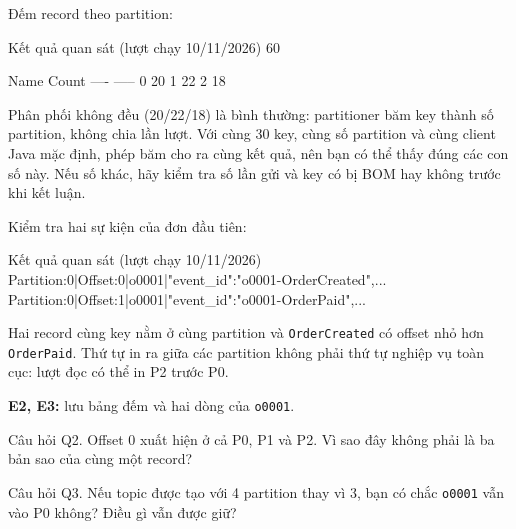 Đếm record theo partition:



\begin{aivnCodeOutput}{Kết quả quan sát (lượt chạy 10/11/2026)}
60

Name Count
---- -----
0       20
1       22
2       18
\end{aivnCodeOutput}

Phân phối không đều (20/22/18) là bình thường: partitioner băm key thành số partition, không chia lần lượt. Với cùng 30 key, cùng số partition và cùng client Java mặc định, phép băm cho ra cùng kết quả, nên bạn có thể thấy đúng các con số này. Nếu số khác, hãy kiểm tra số lần gửi và key có bị BOM hay không trước khi kết luận.


Kiểm tra hai sự kiện của đơn đầu tiên:



\begin{aivnCodeOutput}{Kết quả quan sát (lượt chạy 10/11/2026)}
Partition:0|Offset:0|o0001|{"event_id":"o0001-OrderCreated",...}
Partition:0|Offset:1|o0001|{"event_id":"o0001-OrderPaid",...}
\end{aivnCodeOutput}

Hai record cùng key nằm ở cùng partition và \texttt{OrderCreated} có offset nhỏ hơn \texttt{OrderPaid}. Thứ tự in ra giữa các partition không phải thứ tự nghiệp vụ toàn cục: lượt đọc có thể in P2 trước P0.


\begin{evidencebox}
\textbf{E2, E3:} lưu bảng đếm và hai dòng của \texttt{o0001}.
\end{evidencebox}

\begin{questionbox}{Câu hỏi Q2.}
Offset 0 xuất hiện ở cả P0, P1 và P2. Vì sao đây không phải là ba bản sao của cùng một record?
\end{questionbox}

\begin{questionbox}{Câu hỏi Q3.}
Nếu topic được tạo với 4 partition thay vì 3, bạn có chắc \texttt{o0001} vẫn vào P0 không? Điều gì vẫn được giữ?
\end{questionbox}

